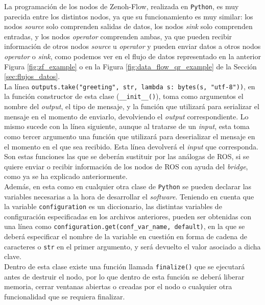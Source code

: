 La programación de los nodos de Zenoh-Flow, realizada en \texttt{Python}, es muy
parecida entre los distintos nodos, ya que su funcionamiento es muy similar: los
nodos \textit{source} solo comprenden salidas de datos, los nodos \textit{sink}
solo comprenden entradas, y los nodos \textit{operator} comprenden ambas, ya que
pueden recibir información de otros nodos \textit{source} u \textit{operator} y
pueden enviar datos a otros nodos \textit{operator} o \textit{sink}, como
podemos ver en el flujo de datos representado en la anterior Figura
\ref{fig:zf_example} o en la Figura \ref{fig:data_flow_qr_example} de la Sección
\ref{sec:flujos_datos}.
\\

La línea \verb|outputs.take("greeting", str, lambda s: bytes(s, "utf-8"))|, en
la función constructor de esta clase (\verb|__init__()|), toma como argumentos
el nombre del \textit{output}, el tipo de mensaje, y la función que utilizará
para serializar el mensaje en el momento de enviarlo, devolviendo el
\textit{output} correspondiente.
Lo mismo sucede con la línea siguiente, aunque al tratarse de un \textit{input},
esta toma como tercer argumento una función que utilizará para deserializar el
mensaje en el momento en el que sea recibido.
Esta línea devolverá el \textit{input} que corresponda.
Son estas funciones las que se deberán sustituir por las análogas de ROS, si se
quiere enviar o recibir información de los nodos de ROS con ayuda del
\textit{bridge}, como ya se ha explicado anteriormente.
\\

Además, en esta como en cualquier otra clase de \texttt{Python} se pueden
declarar las variables necesarias a la hora de desarrollar el \textit{software}.
Teniendo en cuenta que la variable \verb|configuration| es un diccionario, las
distintas variables de configuración especificadas en los archivos anteriores,
pueden ser obtenidas con una línea como
\verb|configuration.get(conf_var_name, default)|, en la que se deberá
especificar el nombre de la variable en cuestión en forma de cadena de
caracteres o \texttt{str} en el primer argumento, y será devuelto el valor
asociado a dicha clave.
\\

Dentro de esta clase existe una función llamada \verb|finalize()| que se
ejecutará antes de destruir el nodo, por lo que dentro de esta función se deberá
liberar memoria, cerrar ventanas abiertas o creadas por el nodo o cualquier otra
funcionalidad que se requiera finalizar.
\\

